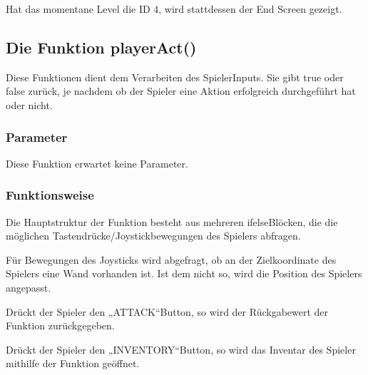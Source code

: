 \documentclass[letterpaper,10pt,ngerman]{sphinxmanual}
\begin{document}
\begin{sphinxVerbatim}[commandchars=\\\{\}]
 
  
  

\PYG{p}{[}\PYG{p}{]}   
\PYG{p}{[}\PYG{p}{]}   
\end{sphinxVerbatim}

Hat das momentane Level die ID 4, wird stattdessen der End Screen gezeigt.


\subsection{Die Funktion playerAct()}
\label{\detokenize{programming:die-funktion-playeract}}
Diese Funktionen dient dem Verarbeiten des Spieler\sphinxhyphen{}Inputs. Sie gibt true oder
false zurück, je nachdem ob der Spieler eine Aktion erfolgreich durchgeführt
hat oder nicht.


\subsubsection{Parameter}
\label{\detokenize{programming:id19}}
Diese Funktion erwartet keine Parameter.


\subsubsection{Funktionsweise}
\label{\detokenize{programming:id20}}
Die Hauptstruktur der Funktion besteht aus mehreren if\sphinxhyphen{}else\sphinxhyphen{}Blöcken, die die
möglichen Tastendrücke/Joystickbewegungen des Spielers abfragen.

Für Bewegungen des Joysticks wird abgefragt, ob an der Zielkoordinate des
Spielers eine Wand vorhanden ist. Ist dem nicht so, wird die Position des
Spielers angepasst.

Drückt der Spieler den „ATTACK“\sphinxhyphen{}Button, so wird der Rückgabewert der Funktion
 zurückgegeben.

Drückt der Spieler den „INVENTORY“\sphinxhyphen{}Button, so wird das Inventar des Spieler
mithilfe der Funktion  geöffnet.
\end{document}
